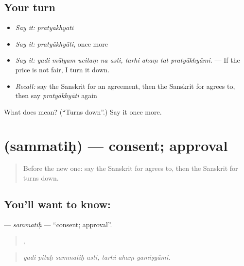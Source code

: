 \subsection*{Your turn}
\begin{itemize}
\raggedright
  \item \emph{Say it:} \emph{pratyākhyāti}
  \item \emph{Say it:} \emph{pratyākhyāti}, once more
  \item \emph{Say it:} \emph{yadi mūlyam ucitaṃ na asti, tarhi ahaṃ tat pratyākhyāmi.} — If the price is not fair, I turn it down.
  \item \emph{Recall:} say the Sanskrit for an agreement, then the Sanskrit for agrees to, then say \emph{pratyākhyāti} again
\end{itemize}

\begin{tcolorbox}[breakable,colback=teal!4,colframe=teal!35!black,title={Before you move on}]
What does  mean? (\textquotedblleft{}Turns down\textquotedblright{}.) Say it once more.
\end{tcolorbox}
\section[\texorpdfstring{\sk{सम्मतिः} (sammatiḥ)}{सम्मतिः (sammatiḥ)}]{ (sammatiḥ) — consent; approval}

\label{lesson:SA-C534-sammatih}



\begin{quote}
Before the new one: say the Sanskrit for agrees to, then the Sanskrit for turns down.
\end{quote}

\subsection*{You'll want to know: }
\textbf{} — \emph{sammatiḥ} — \textquotedblleft{}consent; approval\textquotedblright{}.

\begin{quote}
   ,   
\end{quote}

\begin{quote}
\emph{yadi pituḥ sammatiḥ asti, tarhi ahaṃ gamiṣyāmi.}
\end{quote}

